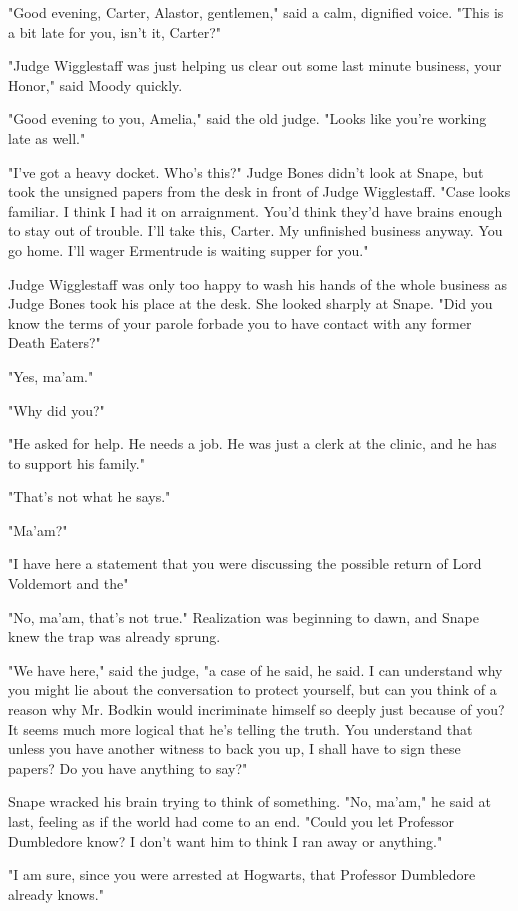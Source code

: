 "Good evening, Carter, Alastor, gentlemen," said a calm, dignified voice. "This is a bit late for you, isn't it, Carter?"

"Judge Wigglestaff was just helping us clear out some last minute business, your Honor," said Moody quickly.

"Good evening to you, Amelia," said the old judge. "Looks like you're working late as well."

"I've got a heavy docket. Who's this?" Judge Bones didn't look at Snape, but took the unsigned papers from the desk in front of Judge Wigglestaff. "Case looks familiar. I think I had it on arraignment. You'd think they'd have brains enough to stay out of trouble. I'll take this, Carter. My unfinished business anyway. You go home. I'll wager Ermentrude is waiting supper for you."

Judge Wigglestaff was only too happy to wash his hands of the whole business as Judge Bones took his place at the desk. She looked sharply at Snape. "Did you know the terms of your parole forbade you to have contact with any former Death Eaters?"

"Yes, ma'am."

"Why did you?"

"He asked for help. He needs a job. He was just a clerk at the clinic, and he has to support his family."

"That's not what he says."

"Ma'am?"

"I have here a statement that you were discussing the possible return of Lord Voldemort and the{\el}"

"No, ma'am, that's not true." Realization was beginning to dawn, and Snape knew the trap was already sprung.

"We have here," said the judge, "a case of he said, he said. I can understand why you might lie about the conversation to protect yourself, but can you think of a reason why Mr. Bodkin would incriminate himself so deeply just because of you? It seems much more logical that he's telling the truth. You understand that unless you have another witness to back you up, I shall have to sign these papers? Do you have anything to say?"

Snape wracked his brain trying to think of something. "No, ma'am," he said at last, feeling as if the world had come to an end. "Could you let Professor Dumbledore know? I don't want him to think I ran away or anything."

"I am sure, since you were arrested at Hogwarts, that Professor Dumbledore already knows."

